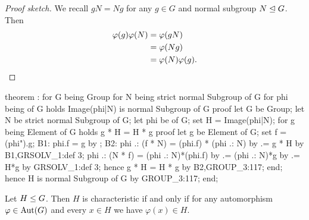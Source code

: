 \begin{proof}[Proof sketch]
We recall $gN=Ng$ for any $g\in G$ and normal subgroup $N\trianglelefteq
G$.
Then
\begin{subequations}
  \begin{align}
    \varphi(g)\varphi(N) &= \varphi(gN)\\
    &=\varphi(Ng)\\
    &=\varphi(N)\varphi(g).\qedhere
  \end{align}
\end{subequations}
\end{proof}

\nwenddocs{}\endmoddef\nwstartdeflinemarkup{}\nwenddeflinemarkup
theorem :
  for G being Group
  for N being strict normal Subgroup of G
  for phi being  of G
  holds Image(phi|N) is normal Subgroup of G
proof
  let G be Group;
  let N be strict normal Subgroup of G;
  let phi be  of G;
  set H = Image(phi|N);
  for g being Element of G holds g * H = H * g
  proof
    let g be Element of G;
    set f = (phi").g;
    B1: phi.f = g by ;
    B2: phi .: (f * N) = (phi.f) * (phi .: N) by 
                      .= g * H by B1,GRSOLV_1:def 3;
    phi .: (N * f) = (phi .: N)*(phi.f) by 
                  .= (phi .: N)*g by 
                  .= H*g by GRSOLV_1:def 3;
    hence g * H = H * g by B2,GROUP_3:117;
  end;
  hence H is normal Subgroup of G by GROUP_3:117;
end;
\eatline
{}\nwendcode{}\nwdocspar
\begin{theorem}
Let $H\leq G$. Then $H$ is characteristic if and only if for any
automorphism $\varphi\in\operatorname{Aut}(G)$ and every $x\in H$ we have
$\varphi(x)\in H$.
\end{theorem}

